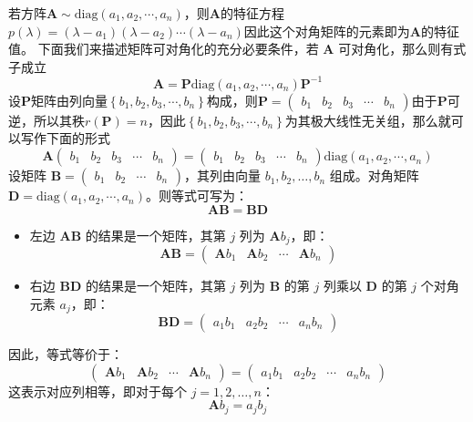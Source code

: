 若方阵$\mathbf{A}\sim \text{diag}(a_{1},a_2,\cdots,a_n)$，则$\mathbf{A}$的特征方程$p(\lambda)=(\lambda-a_1)(\lambda-a_2)\cdots(\lambda-a_n)$因此这个对角矩阵的元素即为$\mathbf{A}$的特征值。
下面我们来描述矩阵可对角化的充分必要条件，若 $\mathbf{A}$ 可对角化，那么则有式子成立$$\mathbf{A}=\mathbf{P}\text{diag}(a_{1},a_2,\cdots,a_n)\mathbf{P}^{-1}$$设$\mathbf{P}$矩阵由列向量$\left\{ b_1,b_2,b_3,\cdots,b_n \right\}$构成，则$\mathbf{P}=\begin{pmatrix}
	b_1 & b_2 & b_3 & \cdots & b_n
\end{pmatrix}$由于$\mathbf{P}$可逆，所以其秩$r(\mathbf{P})=n$，因此$\left\{ b_1,b_2,b_3,\cdots,b_n \right\}$为其极大线性无关组，那么就可以写作下面的形式$$\mathbf{A}\begin{pmatrix}
	b_1 & b_2 & b_3 & \cdots & b_n
\end{pmatrix}=\begin{pmatrix}
	b_1 & b_2 & b_3 & \cdots & b_n
\end{pmatrix}\text{diag}(a_{1},a_2,\cdots,a_n)$$设矩阵 $\mathbf{B} = \begin{pmatrix} b_1 & b_2 & \cdots & b_n \end{pmatrix}$，其列由向量 $b_1, b_2, \ldots, b_n$ 组成。对角矩阵 $\mathbf{D} = \text{diag}(a_1, a_2, \cdots, a_n)$。则等式可写为：
$$
\mathbf{A} \mathbf{B} = \mathbf{B} \mathbf{D}
$$
\begin{itemize}
	\item 左边 $\mathbf{A} \mathbf{B}$ 的结果是一个矩阵，其第 $j$ 列为 $\mathbf{A} b_j$，即：
  $$
  \mathbf{A} \mathbf{B} = \begin{pmatrix} \mathbf{A} b_1 & \mathbf{A} b_2 & \cdots & \mathbf{A} b_n \end{pmatrix}
  $$
  	\item 右边 $\mathbf{B} \mathbf{D}$ 的结果是一个矩阵，其第 $j$ 列为 $\mathbf{B}$ 的第 $j$ 列乘以 $\mathbf{D}$ 的第 $j$ 个对角元素 $a_j$，即：
  $$
  \mathbf{B} \mathbf{D} = \begin{pmatrix} a_1 b_1 & a_2 b_2 & \cdots & a_n b_n \end{pmatrix}
  $$
\end{itemize}

因此，等式等价于：
$$
\begin{pmatrix} \mathbf{A} b_1 & \mathbf{A} b_2 & \cdots & \mathbf{A} b_n \end{pmatrix} = \begin{pmatrix} a_1 b_1 & a_2 b_2 & \cdots & a_n b_n \end{pmatrix}
$$
这表示对应列相等，即对于每个 $j = 1, 2, \ldots, n$：
$$
\mathbf{A} b_j = a_j b_j
$$

